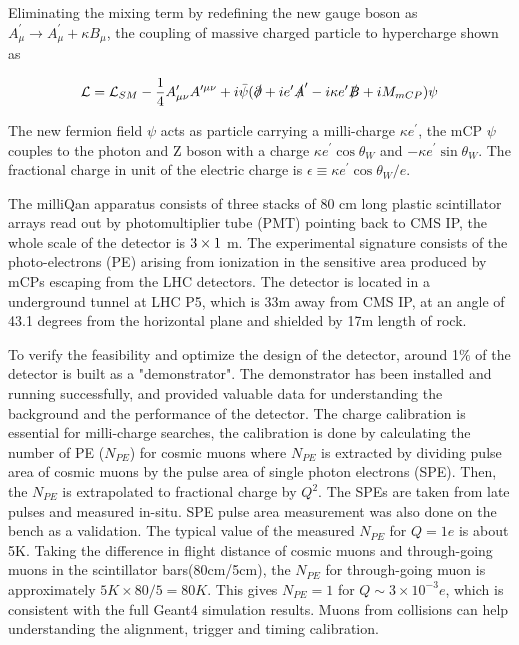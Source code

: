 Eliminating the mixing term by redefining the new gauge boson as $A_{\mu}^{\prime}\rightarrow A_{\mu}^{\prime} + \kappa B_{\mu}$, the coupling of massive charged particle to hypercharge shown as 

\begin{equation}
\mathcal{L} = \mathcal{L}_{SM}-\frac{1}{4}A_{\mu\nu}^{\prime}A^{\prime\mu\nu}+i\bar{\psi}(\slashed{\partial}+ie^{\prime}\slashed{A}^{\prime} - i\kappa e^{\prime}\slashed{B}+ iM_{mCP})\psi
\end{equation}

The new fermion field $\psi$ acts as particle carrying a milli-charge $\kappa e^{\prime}$, the mCP $\psi$ couples to the photon and Z boson with a charge $\kappa e^{\prime}\cos{\theta_W}$ and $-\kappa e^{\prime}\sin{\theta_W}$. The fractional charge in unit of the electric charge is $\epsilon \equiv \kappa e^{\prime} \cos{\theta_W}/e$.

The milliQan apparatus consists of three stacks of 80 cm long plastic scintillator arrays read out by photomultiplier tube (PMT) pointing back to CMS IP, the whole scale of the detector is $3\times1\time1$ m. The experimental signature consists of the photo-electrons (PE) arising from  ionization in the sensitive area produced by mCPs escaping from the LHC detectors. The detector is located in a underground tunnel at LHC P5, which is 33m away from CMS IP, at an angle of 43.1 degrees from the horizontal plane and shielded by 17m length of rock.  

To verify the feasibility  and optimize the design of the detector, around 1$\%$ of the detector is built as a "demonstrator". The demonstrator has been installed and running successfully, and provided valuable data for understanding the background and the performance of the detector. The  charge calibration is essential for milli-charge searches, the calibration is done by calculating the number of PE ($N_{PE}$) for cosmic muons where $N_{PE}$ is extracted by dividing pulse area of cosmic muons by the pulse area of single photon electrons (SPE). Then, the $N_{PE}$ is extrapolated to fractional charge by $Q^2$. The SPEs are taken from late pulses and measured in-situ.  SPE pulse area measurement was also done on the bench as a validation.  The typical value of the measured $N_{PE}$ for $Q= 1e$ is about 5K.  Taking the difference in flight distance of cosmic muons and through-going muons in the scintillator bars(80cm/5cm), the $N_{PE}$ for through-going muon is approximately $5K \times 80/5 =80K$.  This gives $N_{PE}=1$ for $Q \sim 3\times10^{-3}e$, which is consistent with the full Geant4 simulation results. Muons from collisions can help understanding the alignment, trigger and timing calibration.

